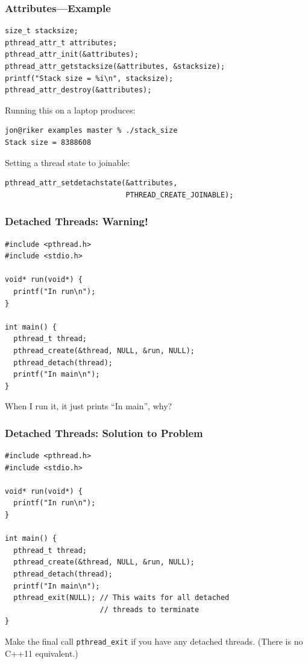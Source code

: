\begin{frame}[fragile]
  \frametitle{Attributes---Example}


  \begin{lstlisting}
size_t stacksize;
pthread_attr_t attributes;
pthread_attr_init(&attributes);
pthread_attr_getstacksize(&attributes, &stacksize);
printf("Stack size = %i\n", stacksize);
pthread_attr_destroy(&attributes);
  \end{lstlisting}
Running this on a laptop produces:
  \begin{lstlisting}
jon@riker examples master % ./stack_size 
Stack size = 8388608
  \end{lstlisting}
  Setting a thread state to joinable:
  \begin{lstlisting}
pthread_attr_setdetachstate(&attributes,
                            PTHREAD_CREATE_JOINABLE);
  \end{lstlisting}


\end{frame}

\begin{frame}[fragile]
  \frametitle{Detached Threads: Warning!}


\begin{lstlisting}
#include <pthread.h>
#include <stdio.h>

void* run(void*) {
  printf("In run\n");
}

int main() {
  pthread_t thread;
  pthread_create(&thread, NULL, &run, NULL);
  pthread_detach(thread);
  printf("In main\n");
}
\end{lstlisting}

  When I run it, it just prints ``In main'', why?


\end{frame}

\begin{frame}[fragile]
  \frametitle{Detached Threads: Solution to Problem}

  \begin{lstlisting}
#include <pthread.h>
#include <stdio.h>

void* run(void*) {
  printf("In run\n");
}

int main() {
  pthread_t thread;
  pthread_create(&thread, NULL, &run, NULL);
  pthread_detach(thread);
  printf("In main\n");
  pthread_exit(NULL); // This waits for all detached
                      // threads to terminate
}
  \end{lstlisting}

  Make the final call {\tt pthread\_exit} if you have any detached threads. (There is no C++11 equivalent.)

\end{frame}

